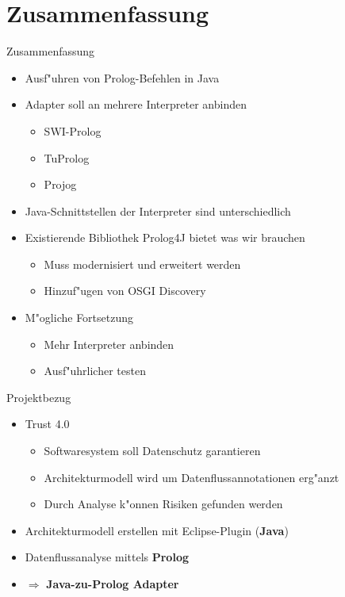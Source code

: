 \documentclass[18pt]{beamer}
\begin{document}
\section{Zusammenfassung}
\begin{frame}{Zusammenfassung}
\begin{itemize}
\item Ausf"uhren von Prolog-Befehlen in Java
\item Adapter soll an mehrere Interpreter anbinden
\begin{itemize}
\item SWI-Prolog
\item TuProlog
\item Projog
\end{itemize}
\item Java-Schnittstellen der Interpreter sind unterschiedlich
\item Existierende Bibliothek Prolog4J bietet was wir brauchen
\begin{itemize}
\item Muss modernisiert und erweitert werden
\item Hinzuf"ugen von OSGI Discovery
\end{itemize}
\item M"ogliche Fortsetzung
\begin{itemize}
\item Mehr Interpreter anbinden
\item Ausf"uhrlicher testen
\end{itemize}
\end{itemize}
\end{frame}

\begin{frame}{Projektbezug}
\begin{itemize}
\item Trust 4.0
\begin{itemize}
\item Softwaresystem soll Datenschutz garantieren
\item Architekturmodell wird um Datenflussannotationen erg"anzt
\item Durch Analyse k"onnen Risiken gefunden werden
\end{itemize}
\vspace{0.5cm}
\item Architekturmodell erstellen mit Eclipse-Plugin (\textbf{Java})
\item Datenflussanalyse mittels \textbf{Prolog}
\vspace{0.5cm}
\item[] $\Rightarrow$ \textbf{Java-zu-Prolog Adapter}
\end{itemize}
\end{frame}
\end{document}

